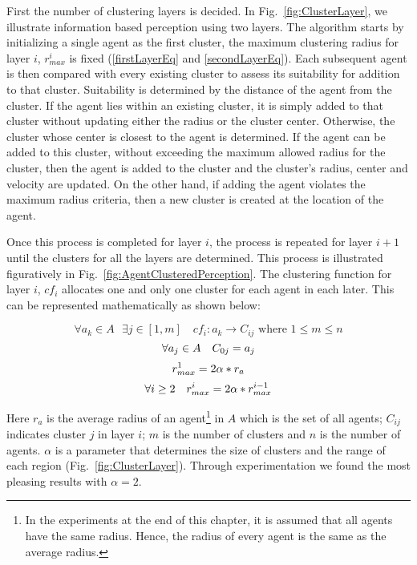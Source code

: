 First the number of clustering layers is decided. In Fig.~\ref{fig:ClusterLayer}, we illustrate information based perception using two layers. The algorithm starts by initializing a single agent as the first cluster, the maximum clustering radius for layer $i$, $r^{i}_{max}$ is fixed (\ref{firstLayerEq} and \ref{secondLayerEq}). Each subsequent agent is then compared with every existing cluster to assess its suitability for addition to that cluster. Suitability is determined by the distance of the agent from the cluster. If the agent lies within an existing cluster, it is simply added to that cluster without updating either the radius or the cluster center. Otherwise, the cluster whose center is closest to the agent is determined. If the agent can be added to this cluster, without exceeding the maximum allowed radius for the cluster, then the agent is added to the cluster and the cluster's radius, center and velocity are updated. On the other hand, if adding the agent violates the maximum radius criteria, then a new cluster is created at the location of the agent.

Once this process is completed for layer $i$, the process is repeated for layer $i+1$ until the clusters for all the layers are determined. This process is illustrated figuratively in Fig.~\ref{fig:AgentClusteredPerception}. The clustering function for layer $i$, $cf_{i}$ allocates one and only one cluster for each agent in each later. This can be represented mathematically as shown below:

\begin{equation}
   \forall a_{k} {\in} A \mbox{ }\exists j \in  [1 , m] \quad cf_{i} : a_{k} {\rightarrow} C_{ij} \mbox{ where } 1 {\leq} m {\leq} n
\end{equation}
\begin{equation}
  \\ \forall a_{j} \in A \quad C_{0j} = a_{j}
\end{equation}  
\begin{equation}
 \\r^{1}_{max} = 2 \alpha * r_{a}
  \label{firstLayerEq}
\end{equation}
\begin{equation}
  \\ \forall i \geq 2 \quad   r^{i}_{max} = 2 \alpha * r ^{i-1} _{max}  
   \label{secondLayerEq}
\end{equation}

Here $r_{a}$ is the average radius of an agent\footnote{In the experiments at the end of this chapter, it is assumed that all agents have the same radius. Hence, the radius of every agent is the same as the average radius.} in $A$ which is the set of all agents; $C_{ij}$ indicates cluster $j$ in layer $i$; $m$ is the number of clusters and $n$ is the number of agents. $\alpha$ is a parameter that determines the size of clusters and the range of each region (Fig.~\ref{fig:ClusterLayer}). Through experimentation we found the most pleasing results with $\alpha = 2$.

